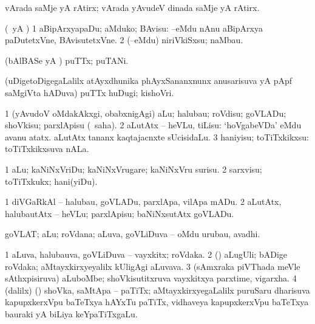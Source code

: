 {{\bentry
{} 
\gl{\nA}
\expl{}
\bmng
vArada saMje yA rAtirx; vArada yAvudeV dinada saMje yA rAtirx. 
\emng
\eentry

\bentry
{} 
\gl{\akirx}
\expl{}
\bmng
(\pArxparx\ yA \kAparx) 
\bnum
\num{1} aBipArxyapaDu; aMduko; BAvisu:  --eMdu nAnu aBipArxya paDutetxVne, BAvisutetxVne. 
\num{2} (--eMdu) niriVkiSxsu; naMbau. 
\enum
\emng
\eentry

\bentry
{} 
\gl{\gu}
\bmng
(bAlBASe yA \AmA) puTTx; puTANi. 
\emng
\eentry

\bentry
{} 
\gl{\nA}
\expl{}
\bmng
(uDigetoDigegaLalilx atAyxdhunika phAyxSananxnunx anusarisuva yA pApf saMgiVta hADuva) puTTx huDugi; kishoVri. 
\emng
\eentry

\bentry
{} 
\gl{\sakirx}
\expl{}
\bmng
\bnum
\num{1} (yAvudoV oMdakAkxgi, obabxnigAgi) aLu; halubau; roVdisu; goVLADu; shoVkisu; parxlApisu (\akirx\ saha). 
\num{2} aLutAtx -- heVLu, tiLisu:  `hoVgabeVDa' eMdu avanu atatx.  aLutAtx tananx kaqtajacnxte sUcisidaLu. 
\num{3} haniyisu; toTiTxkikxsu:  toTiTxkikxsuva nALa. 
\enum
\emng

\noindent 
\gl{\akirx}
\expl{}
\bmng
\bnum
\num{1} aLu; kaNiNxVriDu; kaNiNxVrugare; kaNiNxVru surisu. 
\num{2} sarxvisu; toTiTxkukx; hani(yiDu). 
\enum
\emng

\noindent 
\gl{\pagu}
\expl{}
\bmng
\bnum
\num{1}  diVGaRkAl -- halubau, goVLADu, parxlApa, vilApa mADu. 
\num{2}  aLutAtx, halubautAtx -- heVLu; parxlApisu; baNiNxsutAtx goVLADu. 
\enum
\emng
\eentry

\bentry
{} 
\gl{\nA}
\expl{}
\bmng
goVLAT; aLu; roVdana; aLuva, goVLiDuva -- oMdu urubau, avadhi. 
\emng
\eentry

\bentry
{} 
\gl{\nA}
\expl{}
\bmng
\bnum
\num{1} aLuva, halubauva, goVLiDuva -- vayxkitx; roVdaka. 
\num{2} (\ca) aLugUli; bADige roVdaka; aMtayxkirxyeyalilx kUligAgi aLuvava. 
\num{3} (sAmxraka piVThada meVle sAthxpisiruva) aLuboMbe; shoVkisutitxruva vayxkitxya parxtime, vigarxha. 
\num{4} (\bava dalilx) (\ca) shoVka, saMtApa -- paTiTx; aMtayxkirxyegaLalilx puruSaru dharisuva kapupxkerxVpu baTeTxya hAYxTu paTiTx, vidhaveya kapupxkerxVpu baTeTxya bauraki yA biLiya keYpaTiTxgaLu. 
\enum
\emng
\eentry

}}

